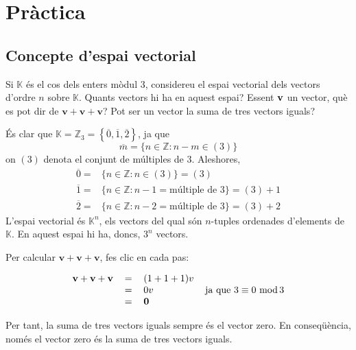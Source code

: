 


\chapter{Pràctica}

\section{Concepte d’espai vectorial}

\begin{exercici}
Si $\mathbb{K}$ és el cos dels enters mòdul 3, considereu el
espai vectorial dels vectors d’ordre $n$ sobre $\mathbb{K}$.
Quants vectors hi ha en aquest espai? Essent $\mathbf{%
v}$ un vector, què es pot dir de $\mathbf{v}+\mathbf{v}%
+\mathbf{v}$? Pot ser un vector la suma de tres vectors
iguals?

\end{exercici}
\begin{solucio}
És clar que $\mathbb{K}=\mathbb{Z}_{3}=\left\{ \overline{0},\overline{1},%
\overline{2}\right\} $, ja que
\begin{equation*}
\overline{m}=\{n\in \mathbb{Z}:n-m\in (3)\}
\end{equation*}%
on $(3)$ denota el conjunt de múltiples de 3. Aleshores,
\begin{align*}
\overline{0}=& \{n\in \mathbb{Z}:n\in (3)\}=(3) \\
\overline{1}=& \{n\in \mathbb{Z}:n-1=\text{múltiple de 3}\}=(3)+1 \\
\overline{2}=& \{n\in \mathbb{Z}:n-2=\text{múltiple de 3}\}=(3)+2
\end{align*}%
L'espai vectorial és $\mathbb{K}^{n}$, els vectors del qual són $n$-tuples
ordenades d’elements de $\mathbb{K}$. En aquest espai hi ha, doncs, $3^{n}$
vectors.

Per calcular $\mathbf{v}+\mathbf{v}+\mathbf{v}$, fes clic en cada pas:

\begin{equation*}
\begin{tabular}{rcll}
$\mathbf{v}+\mathbf{v}+\mathbf{v}$ & = & $(1+1+1)v$ &  \\
& = & $0v$ & ja que $3\equiv 0\,\operatorname{mod}3$ \\
& = & $\mathbf{0}$ &
\end{tabular}%
\end{equation*}

Per tant, la suma de tres vectors iguals sempre és el vector zero. En
conseqüència, només el vector zero és la suma de tres vectors iguals.
\end{solucio}

